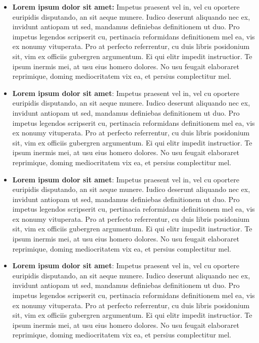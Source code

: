 		\begin{itemize}

			\item \textbf{Lorem ipsum dolor sit amet:} Impetus praesent vel in, vel cu oportere euripidis disputando, an sit aeque munere. Iudico deserunt aliquando nec ex, invidunt antiopam ut sed, mandamus definiebas definitionem ut duo. Pro impetus legendos scripserit cu, pertinacia reformidans definitionem mel ea, vis ex nonumy vituperata. Pro at perfecto referrentur, cu duis libris posidonium sit, vim ex officiis gubergren argumentum. Ei qui elitr impedit instructior. Te ipsum inermis mei, at usu eius homero dolores. No usu feugait elaboraret reprimique, doming mediocritatem vix ea, et persius complectitur mel.

			\item \textbf{Lorem ipsum dolor sit amet}: Impetus praesent vel in, vel cu oportere euripidis disputando, an sit aeque munere. Iudico deserunt aliquando nec ex, invidunt antiopam ut sed, mandamus definiebas definitionem ut duo. Pro impetus legendos scripserit cu, pertinacia reformidans definitionem mel ea, vis ex nonumy vituperata. Pro at perfecto referrentur, cu duis libris posidonium sit, vim ex officiis gubergren argumentum. Ei qui elitr impedit instructior. Te ipsum inermis mei, at usu eius homero dolores. No usu feugait elaboraret reprimique, doming mediocritatem vix ea, et persius complectitur mel.

			\item \textbf{Lorem ipsum dolor sit amet}: Impetus praesent vel in, vel cu oportere euripidis disputando, an sit aeque munere. Iudico deserunt aliquando nec ex, invidunt antiopam ut sed, mandamus definiebas definitionem ut duo. Pro impetus legendos scripserit cu, pertinacia reformidans definitionem mel ea, vis ex nonumy vituperata. Pro at perfecto referrentur, cu duis libris posidonium sit, vim ex officiis gubergren argumentum. Ei qui elitr impedit instructior. Te ipsum inermis mei, at usu eius homero dolores. No usu feugait elaboraret reprimique, doming mediocritatem vix ea, et persius complectitur mel.

			\item \textbf{Lorem ipsum dolor sit amet}: Impetus praesent vel in, vel cu oportere euripidis disputando, an sit aeque munere. Iudico deserunt aliquando nec ex, invidunt antiopam ut sed, mandamus definiebas definitionem ut duo. Pro impetus legendos scripserit cu, pertinacia reformidans definitionem mel ea, vis ex nonumy vituperata. Pro at perfecto referrentur, cu duis libris posidonium sit, vim ex officiis gubergren argumentum. Ei qui elitr impedit instructior. Te ipsum inermis mei, at usu eius homero dolores. No usu feugait elaboraret reprimique, doming mediocritatem vix ea, et persius complectitur mel.


\end{itemize}
